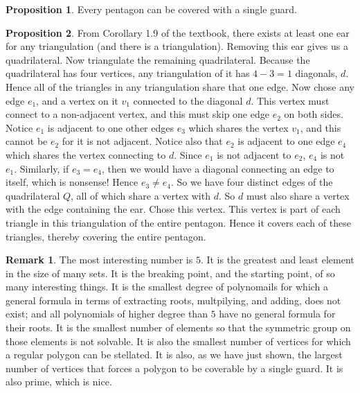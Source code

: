 \documentclass[12pt]{article}
\theoremstyle{definition}
\newtheorem{proposition}{Proposition}
\newtheorem{remark}{Remark}
\begin{document}
\begin{proposition}
Every pentagon can be covered with a single guard.
\end{proposition}

\begin{proposition}
From Corollary 1.9 of the textbook, there exists at least one ear for any triangulation (and there is a triangulation). Removing this ear gives us a quadrilateral. Now triangulate the remaining quadrilateral. Because the quadrilateral has four vertices, any triangulation of it has $4-3 = 1$ diagonals, $d$. Hence all of the triangles in any triangulation share that one edge. Now chose any edge $e_1$, and a vertex on it $v_1$ connected to the diagonal $d$. This vertex must connect to a non-adjacent vertex, and this must skip one edge $e_2$ on both sides. Notice $e_1$ is adjacent to one other edges $e_3$ which shares the vertex $v_1$, and this cannot be $e_2$ for it is not adjacent. Notice also that $e_2$ is adjacent to one edge $e_4$ which shares the vertex connecting to $d$. Since $e_1$ is not adjacent to $e_2$, $e_4$ is not $e_1$. Similarly, if $e_3 = e_4$, then we would have a diagonal connecting an edge to itself, which is nonsense! Hence $e_3 \ne e_4$. So we have four distinct edges of the quadrilateral $Q$, all of which share a vertex with $d$. So $d$ must also share a vertex with the edge containing the ear. Chose this vertex. This vertex is part of each triangle in this triangulation of the entire pentagon. Hence it covers each of these triangles, thereby covering the entire pentagon. 
\end{proposition}

\begin{remark}
The most interesting number is $5$. It is the greatest and least element in the size of many sets. It is the breaking point, and the starting point, of so many interesting things. It is the smallest degree of polynomails for which a general formula in terms of extracting roots, multpilying, and adding, does not exist; and all polynomials of higher degree than $5$ have no general formula for their roots. It is the smallest number of elements so that the symmetric group on those elements is not solvable. It is also the smallest number of vertices for which a regular polygon can be stellated. It is also, as we have just shown, the largest number of vertices that forces a polygon to be coverable by a single guard. It is also prime, which is nice.
\end{remark}
\end{document}
